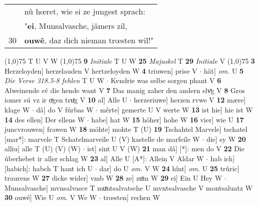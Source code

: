 \documentclass[8pt,a4paper,notitlepage]{article}
\begin{document}
\begin{table}[ht]
\begin{minipage}[t]{0.5\linewidth}
\begin{tabular}{rl}
 & nû hœret, wie si ze jungest sprach:\\ 
 & "\textbf{ei}, Munsalvasche, jâmers zil,\\ 
30 & \textbf{ouwê}, daz dich nieman trœsten wil!"\\ 
\end{tabular}
\scriptsize
\line(1,0){75} \newline
T U V W \newline
\line(1,0){75} \newline
\textbf{9} \textit{Initiale} T U W  \textbf{25} \textit{Majuskel} T  \textbf{29} \textit{Initiale} V  \newline
\line(1,0){75} \newline
\textbf{3} Herzeloyden] herzelauden V hertzeloyden W \textbf{4} triuwen] prise V  $\cdot$ hât] \textit{om.} U \textbf{5} \textit{Die Verse 318.5-8 fehlen} T U W   $\cdot$ Kvndrie was selbe sorgen phant V \textbf{6} Alweinende sv́ die hende want V \textbf{7} Das manig zaher den andern slvͦg V \textbf{8} Gros iomer sú vz ir oͮgen truͦg V \textbf{10} al] Alle U  $\cdot$ herzeriuwe] herzen rvwe V \textbf{12} mære] klage W  $\cdot$ dâ] do V fúrbas W  $\cdot$ mêrte] gemerte U V werte W \textbf{13} ist hie] hie ist W \textbf{14} des ellen] Der ellens W  $\cdot$ habe] hat W \textbf{15} hôher] hohe W \textbf{16} vier] wie U \textbf{17} juncvrouwen] frawen W \textbf{18} möhte] mohte T (U) \textbf{19} Tschahtel Marvele] tschatel [mar*]: marvele T Schatelmarveile U (V) kastelle de marfeile W  $\cdot$ die] sy W \textbf{20} alliu] alle T (U) (V) (W)  $\cdot$ ist] sint U V (W) \textbf{21} man dâ] [*]: men do V \textbf{22} Die úberhebet ir aller schlag W \textbf{23} al] Alle U [A*]: Allein V Aldar W  $\cdot$ hab ich] [habich]: habch T hant ich U  $\cdot$ dar] do U \textit{om.} V W \textbf{24} hînt] \textit{om.} U \textbf{25} trûric] traurens W \textbf{27} dicke wider] vmb W \textbf{28} ze] zuͦm W \textbf{29} ei] Ein U Hey W  $\cdot$ Munsalvasche] mvnsalvasce T muͦntsalvatsche U mvntsalvasche V montsaluatz W \textbf{30} ouwê] Wie U \textit{om.} V We W  $\cdot$ trœsten] rechen W \newline
\end{minipage}
\end{table}
\end{document}
